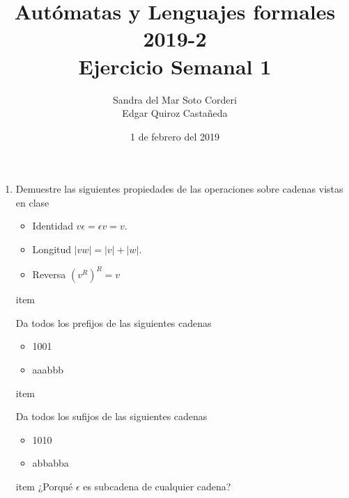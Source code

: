 \documentclass{article}
\begin{document}
\title{Autómatas y Lenguajes formales 2019-2\\
        \large Ejercicio Semanal 1}

\date{1 de febrero del 2019}

\author{Sandra del Mar Soto Corderi\\
        Edgar Quiroz Castañeda}

\maketitle


\begin{enumerate}
    \item {
        Demuestre las siguientes propiedades de las operaciones sobre cadenas 
        vistas en clase
        
        \begin{itemize}
            \item {
                Identidad $v\epsilon = \epsilon v = v$.
            }

            \item {
                Longitud $|vw| = |v| + |w|$.
            }

            \item {
                Reversa $(v^R)^R = v$
            }
        \end{itemize}
    }

    item {
        Da todos los prefijos de las siguientes cadenas

        \begin{itemize}
            \item {
                1001
            }

            \item {
                aaabbb
            }
        \end{itemize}
    }

    item {
        Da todos los sufijos de las siguientes cadenas

        \begin{itemize}
            \item {
                1010
            }

            \item {
                abbabba
            }
        \end{itemize}
    }

    item {
        ¿Porqué $\epsilon$ es subcadena de cualquier cadena?
    }

\end{enumerate}
    
\end{document}
